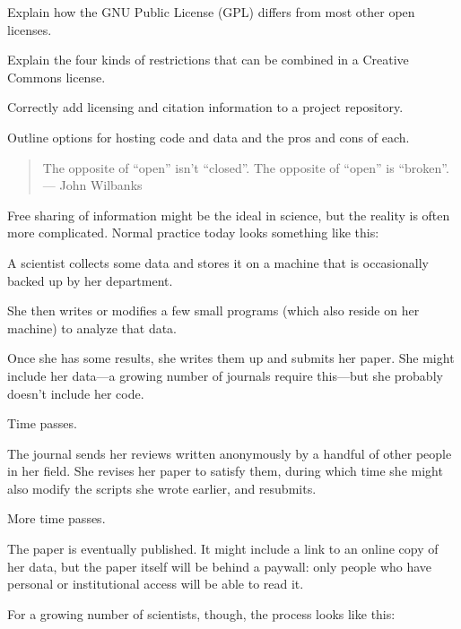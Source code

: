 \documentclass{book}
\begin{document}
\begin{swcitemize}
\item
  Explain how the GNU Public License (GPL) differs from most other open
  licenses.
\item
  Explain the four kinds of restrictions that can be combined in a
  Creative Commons license.
\item
  Correctly add licensing and citation information to a project
  repository.
\item
  Outline options for hosting code and data and the pros and cons of
  each.
\end{swcitemize}

\begin{quote}
The opposite of ``open'' isn't ``closed''. The opposite of ``open'' is
``broken''. \\
--- John Wilbanks
\end{quote}

Free sharing of information might be the ideal in science, but the
reality is often more complicated. Normal practice today looks something
like this:

\begin{swcitemize}
\item
  A scientist collects some data and stores it on a machine that is
  occasionally backed up by her department.
\item
  She then writes or modifies a few small programs (which also reside on
  her machine) to analyze that data.
\item
  Once she has some results, she writes them up and submits her paper.
  She might include her data---a growing number of journals require
  this---but she probably doesn't include her code.
\item
  Time passes.
\item
  The journal sends her reviews written anonymously by a handful of
  other people in her field. She revises her paper to satisfy them,
  during which time she might also modify the scripts she wrote earlier,
  and resubmits.
\item
  More time passes.
\item
  The paper is eventually published. It might include a link to an
  online copy of her data, but the paper itself will be behind a
  paywall: only people who have personal or institutional access will be
  able to read it.
\end{swcitemize}

For a growing number of scientists, though, the process looks like this:
\end{document}
